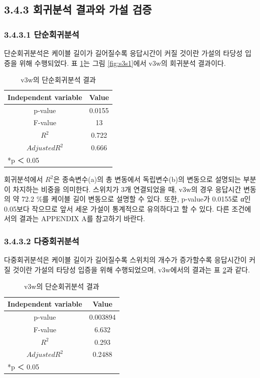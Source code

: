 \documentclass[11pt
  , a4paper
  , article
  , oneside
]{memoir}
\begin{document}
 \subsection{3.4.3 회귀분석 결과와 가설 검증}
\subsubsection{3.4.3.1 단순회귀분석}
단순회귀분석은 케이블 길이가 길어질수록 응답시간이 커질 것이란 가설의 타당성 입증을 위해 수행되었다. 표 \ref{table:regression}는 그림 \ref{fig:s3s1}에서 v3w의 회귀분석 결과이다. 
 
\begin{table}[!htb]
\begin{center}
\begin{tabular}{c|c}\hline
Independent variable & Value  \\ \hline\hline
p-value &  0.0155\\ 
F-value &  13\\ 
$  R^2  $ &  0.722\\ 
$ Adjusted R^2 $ & 0.666 \\ \hline
\multicolumn{2}{l}{*p ＜ 0.05} \\ \hline\hline
\end{tabular}
\caption{v3w의 단순회귀분석 결과}
  \label{table:regression}  
\end{center}
\end{table} 

회귀분석에서 $  R^2  $은 종속변수(a)의 총 변동에서 독립변수(b)의 변동으로 설명되는 부분이 차지하는 비중을 의미한다. 스위치가 3개 연결되었을 때, v3w의 경우 응답시간 변동의 약 72.2 \%를 케이블 길이 변동으로 설명할 수 있다. 또한, p-value가 0.0155로 α인 0.05보다 작으므로 앞서 세운 가설이 통계적으로 유의하다고 할 수 있다. 다른 조건에서의 결과는 APPENDIX A를 참고하기 바란다.

\subsubsection{3.4.3.2 다중회귀분석}
다중회귀분석은 케이블 길이가 길어질수록 스위치의 개수가 증가할수록 응답시간이 커질 것이란 가설의 타당성 입증을 위해 수행되었으며, v3w에서의 결과는 표 \ref{table:multiregression}과 같다. 

\begin{table}[!htb]
\begin{center}
\begin{tabular}{c|c}\hline
Independent variable & Value  \\ \hline\hline
p-value &  0.003894\\ 
F-value &  6.632\\ 
$  R^2  $ &  0.293\\ 
$ Adjusted R^2 $ & 0.2488 \\ \hline
\multicolumn{2}{l}{*p ＜ 0.05} \\ \hline\hline
\end{tabular}
\caption{v3w의 단순회귀분석 결과}
  \label{table:multiregression}  
\end{center}
\end{table} 
\end{document}
